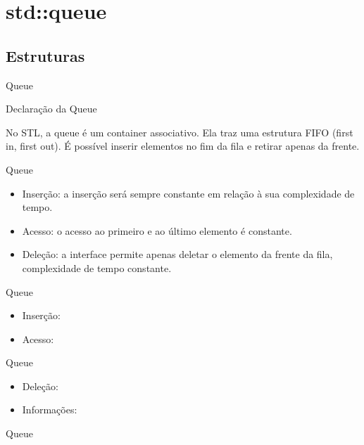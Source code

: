 \section{std::queue}

\subsection{Estruturas}

\begin{frame}[fragile]{Queue}

    \begin{block}{Declaração da Queue}
    \end{block}
	
    No STL, a queue é um container associativo. Ela traz uma estrutura FIFO (first in, first out). É possível inserir elementos no fim da fila e retirar apenas da frente.
    
\end{frame}

\begin{frame}[fragile]{Queue}

    \begin{itemize}
        \item Inserção: a inserção será sempre constante em relação à sua complexidade de tempo.
        \item Acesso: o acesso ao primeiro e ao último elemento é constante.
        \item Deleção: a interface permite apenas deletar o elemento da frente da fila, complexidade de tempo constante.
    \end{itemize}

\end{frame}

\begin{frame}[fragile]{Queue}

    \begin{itemize}
        \item Inserção:
        \item Acesso:
    \end{itemize}

\end{frame}

\begin{frame}[fragile]{Queue}

    \begin{itemize}
        \item Deleção:
        \item Informações:
    \end{itemize}

\end{frame}

\begin{frame}[fragile]{Queue}


\end{frame}
